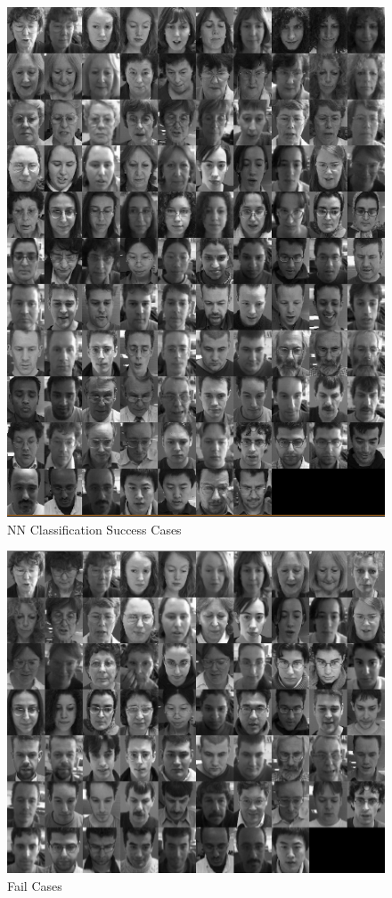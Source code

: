 \documentclass[10pt,technote]{IEEEtran}
\begin{document}
\begin{figure}
    \centering
    \includegraphics[width=\linewidth]{../results/1bb/NN_SUCCESS2.png}
    \caption{NN Classification Success Cases}
    \label{fig:nn_successes}
\end{figure}

\begin{figure}
    \centering
    \includegraphics[width=\linewidth]{../results/1bb/REC_FAIL2.png}
    \caption{Fail Cases}
    \label{fig:nn_fails}
\end{figure}
\end{document}
